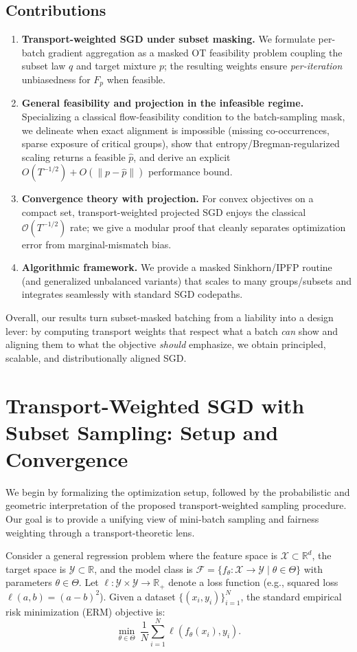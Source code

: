 \documentclass[9pt]{extarticle}
\theoremstyle{definition}
\begin{document}
\subsection*{Contributions}
\begin{enumerate}
\item \textbf{Transport-weighted SGD under subset masking.} We formulate per-batch gradient aggregation as a masked OT feasibility problem coupling the subset law $q$ and target mixture $p$; the resulting weights ensure \emph{per-iteration} unbiasedness for $F_p$ when feasible.
\item \textbf{General feasibility and projection in the infeasible regime.} Specializing a classical flow-feasibility condition to the batch-sampling mask, we delineate when exact alignment is impossible (missing co-occurrences, sparse exposure of critical groups), show that entropy/Bregman-regularized scaling returns a feasible $\hat{p}$, and derive an explicit $O(T^{-1/2})+O(\|p-\hat{p}\|)$ performance bound.
\item \textbf{Convergence theory with projection.} For convex objectives on a compact set, transport-weighted projected SGD enjoys the classical $\mathcal{O}(T^{-1/2})$ rate; we give a modular proof that cleanly separates optimization error from marginal-mismatch bias.
\item \textbf{Algorithmic framework.} We provide a masked Sinkhorn/IPFP routine (and generalized unbalanced variants) that scales to many groups/subsets and integrates seamlessly with standard SGD codepaths.
\end{enumerate}
Overall, our results turn subset-masked batching from a liability into a design lever: by computing transport weights that respect what a batch \emph{can} show and aligning them to what the objective \emph{should} emphasize, we obtain principled, scalable, and distributionally aligned SGD.
\section{Transport-Weighted SGD with Subset Sampling: Setup and Convergence}
We begin by formalizing the optimization setup, followed by the probabilistic and geometric interpretation of the proposed transport-weighted sampling procedure. Our goal is to provide a unifying view of mini-batch sampling and fairness weighting through a transport-theoretic lens.

Consider a general regression problem where the feature space is $\mathcal{X}\subset \mathbb{R}^d$, the target space is $\mathcal{Y}\subset \mathbb{R}$, and the model class is $\mathcal{F}=\{f_\theta:\mathcal{X}\rightarrow \mathcal{Y}\mid \theta\in\Theta\}$ with parameters $\theta\in\Theta$. Let $\ell:\mathcal{Y}\times\mathcal{Y}\rightarrow \mathbb{R}_+$ denote a loss function (e.g., squared loss $\ell(a,b)=(a-b)^2$). Given a dataset $\{(x_i,y_i)\}_{i=1}^N$, the standard empirical risk minimization (ERM) objective is:
\begin{equation}\label{eq:erm}
\boxed{\min_{\theta\in\Theta} \ \frac{1}{N}\sum_{i=1}^{N}\ell(f_\theta(x_i),y_i)}.
\end{equation}
\end{document}
